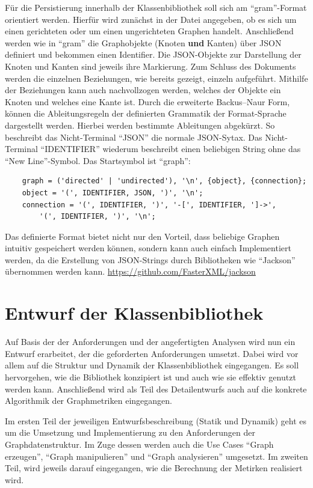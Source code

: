 \documentclass[a4paper,12pt,ngerman,chapterprefix=false,listof=totoc,bibliography=totoc]{scrreprt}
\begin{document}
{{{Für die Persistierung innerhalb der Klassenbibliothek soll sich am "`gram"'-Format orientiert werden. Hierfür wird zunächst in der Datei angegeben, ob es sich um einen gerichteten oder um einen ungerichteten Graphen handelt. Anschließend werden wie in "`gram"' die Graphobjekte (Knoten \textbf{und} Kanten) über JSON definiert und bekommen einen Identifier. Die JSON-Objekte zur Darstellung der Knoten und Kanten sind jeweils ihre Markierung. Zum Schluss des Dokuments werden die einzelnen Beziehungen, wie bereits gezeigt, einzeln aufgeführt. Mithilfe der Beziehungen kann auch nachvollzogen werden, welches der Objekte ein Knoten und welches eine Kante ist. Durch die erweiterte Backus–Naur Form, können die Ableitungsregeln der definierten Grammatik der Format-Sprache dargestellt werden. Hierbei werden bestimmte Ableitungen abgekürzt. So beschreibt das Nicht-Terminal "`JSON"' die normale JSON-Sytax. Das Nicht-Terminal "`IDENTIFIER"' wiederum beschreibt einen beliebigen String ohne das "`New Line"'-Symbol. Das Startsymbol ist "`graph"':
\begin{verbatim}
	graph = ('directed' | 'undirected'), '\n', {object}, {connection};
	object = '(', IDENTIFIER, JSON, ')', '\n';
	connection = '(', IDENTIFIER, ')', '-[', IDENTIFIER, ']->', 
		'(', IDENTIFIER, ')', '\n';
\end{verbatim}
Das definierte Format bietet nicht nur den Vorteil, dass beliebige Graphen intuitiv gespeichert werden können, sondern kann auch einfach Implementiert werden, da die Erstellung von JSON-Strings durch Bibliotheken wie "`Jackson"' übernommen werden kann. \url{https://github.com/FasterXML/jackson}
}
\section{Entwurf der Klassenbibliothek}
{
Auf Basis der der Anforderungen und der angefertigten Analysen wird nun ein Entwurf erarbeitet, der die geforderten Anforderungen umsetzt. Dabei wird vor allem auf die Struktur und Dynamik der Klassenbibliothek eingegangen. Es soll hervorgehen, wie die Bibliothek konzipiert ist und auch wie sie effektiv genutzt werden kann. Anschließend wird als Teil des Detailentwurfs auch auf die konkrete Algorithmik der Graphmetriken eingegangen. \cite{balzert_lehrbuch_2011}

Im ersten Teil der jeweiligen Entwurfsbeschreibung (Statik und Dynamik) geht es um die Umsetzung und Implementierung zu den Anforderungen der Graphdatenstruktur. Im Zuge dessen werden auch die Use Cases "`Graph erzeugen"', "`Graph manipulieren"' und "`Graph analysieren"' umgesetzt. Im zweiten Teil, wird jeweils darauf eingegangen, wie die Berechnung der Metirken realisiert wird.
}
}}
\end{document}
